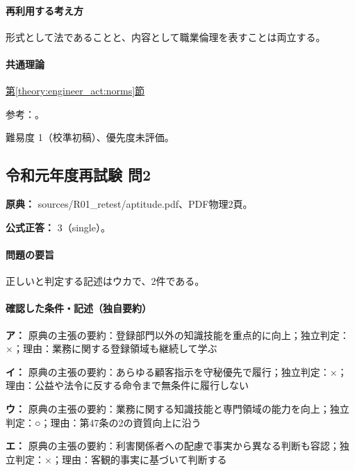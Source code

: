 \paragraph{再利用する考え方} 形式として法であることと、内容として職業倫理を表すことは両立する。

\paragraph{共通理論} \hyperref[theory:engineer_act:norms]{第\ref*{theory:engineer_act:norms}節}

\par 参考：\cite{engineer_act_current}。

\par 難易度 1（校準初稿）、優先度未評価。

\subsection{令和元年度再試験 問2}
\label{q:r01-ret-apt-02}

\noindent\textbf{原典：} sources/R01\_retest/aptitude.pdf、PDF物理2頁。

\textbf{公式正答：} 3（single）。

\paragraph{問題の要旨} 正しいと判定する記述はウカで、2件である。

\paragraph{確認した条件・記述（独自要約）}\mbox{}\par

\noindent\textbf{ア：} 原典の主張の要約：登録部門以外の知識技能を重点的に向上；独立判定：×；理由：業務に関する登録領域も継続して学ぶ\par

\noindent\textbf{イ：} 原典の主張の要約：あらゆる顧客指示を守秘優先で履行；独立判定：×；理由：公益や法令に反する命令まで無条件に履行しない\par

\noindent\textbf{ウ：} 原典の主張の要約：業務に関する知識技能と専門領域の能力を向上；独立判定：○；理由：第47条の2の資質向上に沿う\par

\noindent\textbf{エ：} 原典の主張の要約：利害関係者への配慮で事実から異なる判断も容認；独立判定：×；理由：客観的事実に基づいて判断する\par

